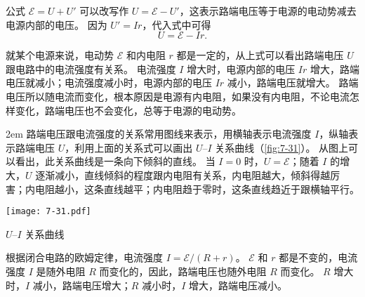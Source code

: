 公式 $\mathcal{E}=U+U'$ 可以改写作 $U=\mathcal{E}-U'$，这表示路端电压等于电源的电动势减去电源内部的电压。
因为 $U'=Ir$，代入式中可得
\[U=\mathcal{E}-Ir.\]

就某个电源来说，电动势 $\mathcal{E}$ 和内电阻 $r$ 都是一定的，从上式可以看出路端电压 $U$ 跟电路中的电流强度有关系。
电流强度 $I$ 增大时，电源内部的电压 $Ir$ 增大，路端电压就减小；电流强度减小时，电源内部的电压 $Ir$ 减小，路端电压就增大。
路端电压所以随电流而变化，根本原因是电源有内电阻，如果没有内电阻，不论电流怎样变化，路端电压也不会变化，总等于电源的电动势。

\medskip\noindent
\begin{minipage}{0.6\linewidth}\parindent2em
路端电压跟电流强度的关系常用图线来表示，用横轴表示电流强度 $I$，纵轴表示路端电压 $U$，利用上面的关系式可以画出 $U$--$I$ 关系曲线（\cref{fig:7-31}）。
从图上可以看出，此关系曲线是一条向下倾斜的直线。
当 $I=0$ 时，$U=\mathcal{E}$；随着 $I$ 的增大，$U$ 逐渐减小，直线倾斜的程度跟内电阻有关系，内电阻越大，倾斜得越厉害；内电阻越小，这条直线越平；内电阻趋于零时，这条直线趋近于跟横轴平行。
\end{minipage}\hfill
\begin{minipage}{0.35\linewidth}\centering
  \begin{figurehere}
    \texttt{[image: 7-31.pdf]}
    \caption{$U$--$I$ 关系曲线}\label{fig:7-31}
  \end{figurehere}
\end{minipage}

\medskip
根据闭合电路的欧姆定律，电流强度 $I=\mathcal{E}/(R+r)$。
$\mathcal{E}$ 和 $r$ 都是不变的，电流强度 $I$ 是随外电阻 $R$ 而变化的，因此，路端电压也随外电阻 $R$ 而变化。
$R$ 增大时，$I$ 减小，路端电压增大；$R$ 减小时，$I$ 增大，路端电压减小。

